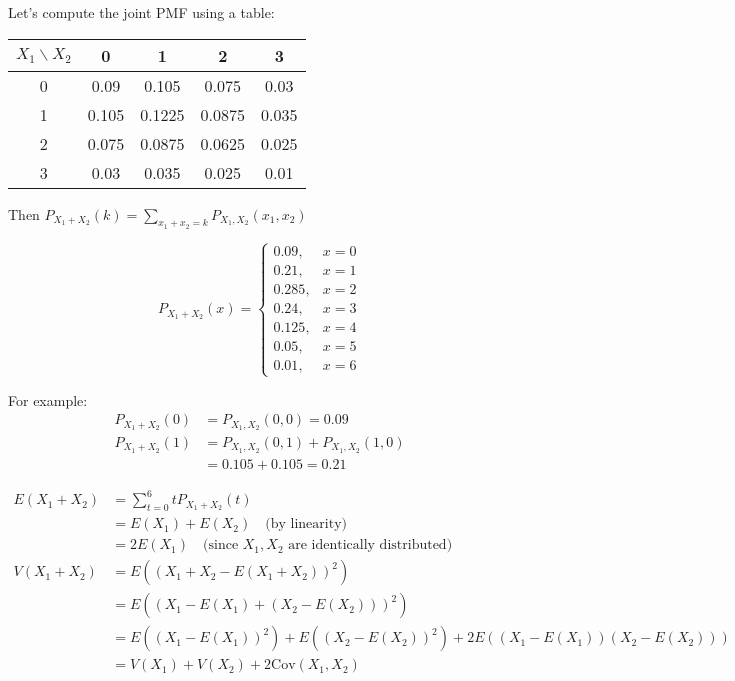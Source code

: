 \documentclass{article}
\begin{document}
    Let's compute the joint PMF using a table:
    \begin{center}
        \begin{tabular}{c|cccc}
            $X_1 \backslash X_2$ & 0 & 1 & 2 & 3 \\ \hline
            0 & 0.09 & 0.105 & 0.075 & 0.03 \\
            1 & 0.105 & 0.1225 & 0.0875 & 0.035 \\
            2 & 0.075 & 0.0875 & 0.0625 & 0.025 \\
            3 & 0.03 & 0.035 & 0.025 & 0.01
        \end{tabular}
    \end{center}

    Then $P_{X_1+X_2}(k) = \sum_{x_1+x_2=k} P_{X_1,X_2}(x_1,x_2)$
    
    \[
    P_{X_1+X_2}(x) = 
    \begin{cases}
        0.09,  & x = 0 \\
        0.21,  & x = 1 \\
        0.285, & x = 2 \\
        0.24,  & x = 3 \\
        0.125, & x = 4 \\
        0.05,  & x = 5 \\
        0.01,  & x = 6
    \end{cases}
    \]

    \noindent
    For example:
    \begin{align*}
        P_{X_1+X_2}(0) &= P_{X_1,X_2}(0,0) = 0.09 \\
        P_{X_1+X_2}(1) &= P_{X_1,X_2}(0,1) + P_{X_1,X_2}(1,0) \\
                       &= 0.105 + 0.105 = 0.21
    \end{align*}


    \begin{align*}
        E(X_1+X_2) &= \sum_{t = 0}^6 t P_{X_1+X_2}(t) \\[1em]
        &= E(X_1) + E(X_2) \quad \text{(by linearity)} \\[0.5em]
        &= 2E(X_1) \quad \text{(since $X_1,X_2$ are identically distributed)} \\[2em]
        V(X_1+X_2) &= E((X_1+X_2-E(X_1+X_2))^2) \\[0.5em]
        &= E((X_1-E(X_1)+(X_2-E(X_2)))^2) \\[0.5em]
        &= E((X_1-E(X_1))^2) + E((X_2-E(X_2))^2) + 2E((X_1-E(X_1))(X_2-E(X_2))) \\[0.5em]
        &= V(X_1) + V(X_2) + 2\text{Cov}(X_1,X_2)
    \end{align*}
\end{document}
